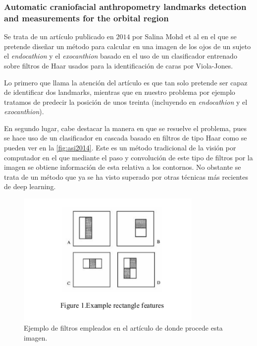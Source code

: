             \subsubsection{Automatic craniofacial anthropometry landmarks detection and measurements for the orbital region}
                \noindent Se trata de un artículo publicado en $2014$ por Salina Mohd et al \cite{asi2014automatic} en el que se pretende diseñar un método para calcular en una imagen de los ojos de un sujeto el \textit{endocathion} y el \textit{exocanthion} basado en el uso de un clasificador entrenado sobre filtros de Haar usados para la identificación de caras por Viola-Jones.

                \medskip

                \noindent Lo primero que llama la atención del artículo es que tan solo pretende ser capaz de identificar dos landmarks, mientras que en nuestro problema por ejemplo tratamos de predecir la posición de unos treinta (incluyendo en \textit{endocathion} y el \textit{exocanthion}).

                \medskip

                \noindent En segundo lugar, cabe destacar la manera en que se resuelve el problema, pues se hace uso de un clasificador en cascada basado en filtros de tipo Haar como se pueden ver en la \autoref{fig:asi2014}. Este es un método tradicional de la visión por computador en el que mediante el paso y convolución de este tipo de filtros por la imagen se obtiene información de esta relativa a los contornos. No obstante se trata de un método que ya se ha visto superado por otras técnicas más recientes de deep learning.

                \begin{figure}[!h]
                    \centering
                    \includegraphics[width=0.8\textwidth]{img/caracteristicas_haar.png}
                    \caption{Ejemplo de filtros empleados en el artículo \cite{asi2014automatic} de donde procede esta imagen.}
                    \label{fig:asi2014}
                \end{figure}

